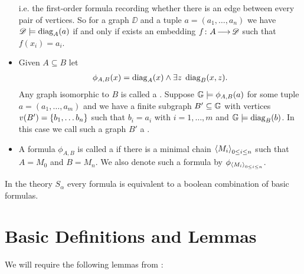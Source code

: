 \documentclass{amsart}
\begin{document}
\begin{Definition}
\begin{itemize}
    i.e. the first-order formula recording whether there is an edge between every pair of vertices.
    So for a graph $\DD$ and a tuple $a = (a_1, \ldots, a_n)$ we have $\mathscr D \models \operatorname{diag}_A(a)$ if and only if
    exists an embedding $f \colon A \operatorname{\longrightarrow} \mathscr D$ such that $f(x_i) = a_i$.
  \item Given $A \subseteq B$ let 
    \begin{align*}
      \phi_{A,B}(x) = \operatorname{diag}_A(x) \wedge \exists z \; \operatorname{diag}_B(x, z).
    \end{align*}
    Any graph isomorphic to $B$ is called a .
    Suppose $\mathbb G \models \phi_{A,B}(a)$ for some tuple $a = (a_1, \ldots, a_m)$
    and we have a finite subgraph $B' \subseteq \mathbb G$ with vertices $v(B') = \left\{b_1, \ldots b_n\right\}$
    such that $b_i = a_i$ with $i = 1, \ldots, m$ and $\mathbb G \models \operatorname{diag}_B(b)$.
    In this case we call such a graph $B'$ a .
  \item A formula $\phi_{A,B}$ is called a 
    if there is a minimal chain $\left\langle M_i \right\rangle_{0 \leq i \leq n}$
    such that $A = M_0$ and $B = M_n$.
    We also denote such a formula by $\phi_{\left\langle M_i \right\rangle_{0 \leq i \leq n}}$. 
  \end{itemize}
\end{Definition}
 
\begin{Theorem} 
  In the theory $S_\alpha$ every formula is equivalent to a boolean combination of basic formulas.
\end{Theorem}

\section{Basic Definitions and Lemmas}
We will require the following lemmas from \cite{laskowski}:
\end{document}
